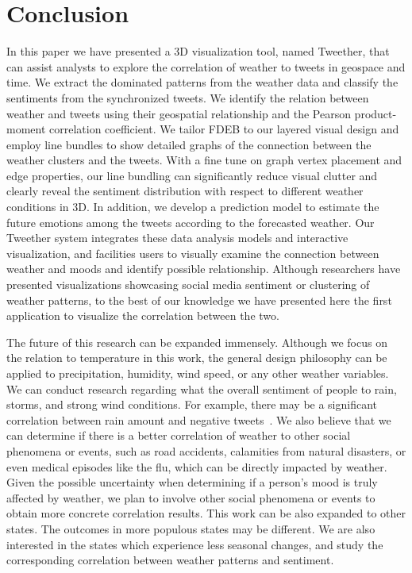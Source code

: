 \section{Conclusion}

In this paper we have presented a 3D visualization tool, named Tweether, that can assist analysts to explore the correlation of weather to tweets in geospace and time. We extract the dominated patterns from the weather data and classify the sentiments from the synchronized tweets. We identify the relation between weather and tweets using their geospatial relationship and the Pearson product-moment correlation coefficient. We tailor FDEB to our layered visual design and employ line bundles to show detailed graphs of the connection between the weather clusters and the tweets. With a fine tune on graph vertex placement and edge properties, our line bundling can significantly reduce visual clutter and clearly reveal the sentiment distribution with respect to different weather conditions in 3D. In addition, we develop a prediction model to estimate the future emotions among the tweets according to the forecasted weather. Our Tweether system integrates these data analysis models and interactive visualization, and facilities users to visually examine the connection between weather and moods and identify possible relationship. 
%
Although researchers have presented visualizations showcasing social media sentiment or clustering of weather patterns, to the best of our knowledge we have presented here the first application to visualize the correlation between the two. 


The future of this research can be expanded immensely. Although we focus on the relation to temperature in this work, the general design philosophy can be applied to precipitation, humidity, wind speed, or any other weather variables. 
We can conduct research regarding what the overall sentiment of people to rain, storms, and strong wind conditions. For example, there may be a significant correlation between rain amount and negative tweets~\cite{hannak2012tweetin}. We also believe that we can determine if there is a better correlation of weather to other social phenomena or events, such as road accidents, calamities from natural disasters, or even medical episodes like the flu, which can be directly impacted by weather. Given the possible uncertainty when determining if a person's mood is truly affected by weather, we plan to involve other social phenomena or events to obtain more concrete correlation results.
%
This work can be also expanded to other states. The outcomes in more populous states may be different. We are also interested in the states which experience less seasonal changes, and study the corresponding correlation between weather patterns and sentiment.

